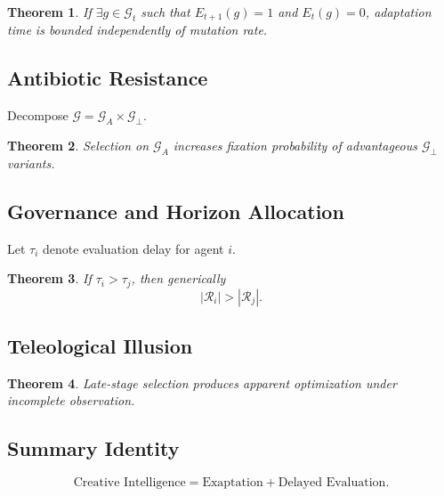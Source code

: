 \documentclass[11pt]{article}
\newtheorem{theorem}{Theorem}
\theoremstyle{definition}
\begin{document}
\begin{theorem}
If $\exists g \in \mathcal{G}_t$ such that $E_{t+1}(g)=1$ and $E_t(g)=0$, adaptation time is bounded independently of mutation rate.
\end{theorem}

\subsection{Antibiotic Resistance}

Decompose $\mathcal{G} = \mathcal{G}_A \times \mathcal{G}_\perp$.

\begin{theorem}
Selection on $\mathcal{G}_A$ increases fixation probability of advantageous $\mathcal{G}_\perp$ variants.
\end{theorem}

\subsection{Governance and Horizon Allocation}

Let $\tau_i$ denote evaluation delay for agent $i$.

\begin{theorem}
If $\tau_i > \tau_j$, then generically
\[
|\mathcal{R}_i| > |\mathcal{R}_j|.
\]
\end{theorem}

\subsection{Teleological Illusion}

\begin{theorem}
Late-stage selection produces apparent optimization under incomplete observation.
\end{theorem}

\subsection{Summary Identity}

\[
\text{Creative Intelligence} = \text{Exaptation} + \text{Delayed Evaluation}.
\]
\end{document}
